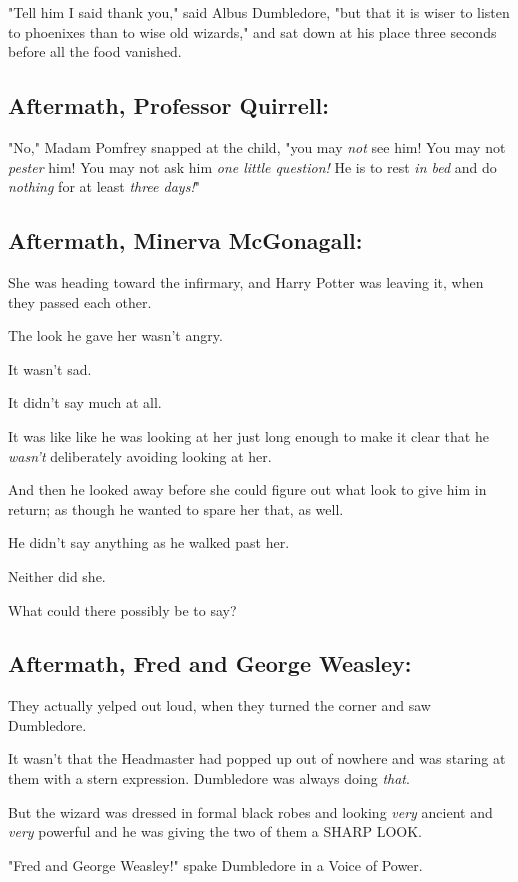 "Tell him I said thank you," said Albus Dumbledore, "but that it is wiser to
listen to phoenixes than to wise old wizards," and sat down at his place three
seconds before all the food vanished.
\sbreak
\subsection{Aftermath, Professor Quirrell:}

"No," Madam Pomfrey snapped at the child, "you may \emph{not} see him! You may
not \emph{pester} him! You may not ask him \emph{one little question!} He is to
rest \emph{in bed} and do \emph{nothing} for at least \emph{three days!}"
\sbreak
\subsection{Aftermath, Minerva McGonagall:}

She was heading toward the infirmary, and Harry Potter was leaving it, when
they passed each other.

The look he gave her wasn't angry.

It wasn't sad.

It didn't say much at all.

It was like{\el} like he was looking at her just long enough to make it
clear that he \emph{wasn't} deliberately avoiding looking at her.

And then he looked away before she could figure out what look to give him in
return; as though he wanted to spare her that, as well.

He didn't say anything as he walked past her.

Neither did she.

What could there possibly be to say?
\sbreak
\subsection{Aftermath, Fred and George Weasley:}

They actually yelped out loud, when they turned the corner and saw Dumbledore.

It wasn't that the Headmaster had popped up out of nowhere and was staring at
them with a stern expression. Dumbledore was always doing \emph{that}.

But the wizard was dressed in formal black robes and looking \emph{very}
ancient and \emph{very} powerful and he was giving the two of them a SHARP LOOK.

"Fred and George Weasley!" spake Dumbledore in a Voice of Power.

